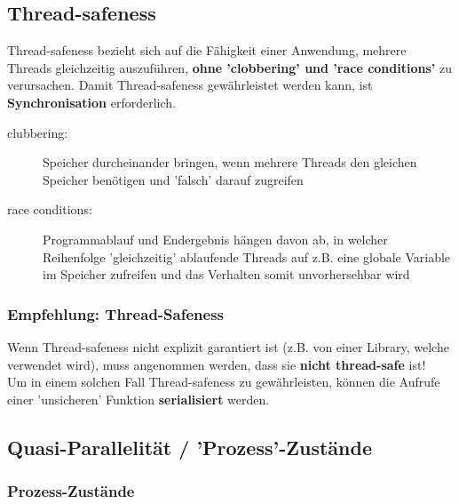 \subsection{Thread-safeness}

Thread-safeness bezieht sich auf die Fähigkeit einer Anwendung, mehrere Threads gleichzeitig auszuführen,
\textbf{ohne 'clobbering' und 'race conditions'} zu verursachen. Damit Thread-safeness gewährleistet werden kann, ist \textbf{Synchronisation}
erforderlich.

\vspace{0.1cm}

\begin{description}
    \item[clubbering:] Speicher durcheinander bringen, wenn mehrere Threads den gleichen Speicher benötigen und 'falsch' darauf zugreifen
    \item[race conditions:] Programmablauf und Endergebnis hängen davon ab, in welcher Reihenfolge 'gleichzeitig' ablaufende Threads auf z.B. eine
        globale Variable im Speicher zufreifen und das Verhalten somit unvorhersehbar wird
\end{description}


\subsubsection{Empfehlung: Thread-Safeness}

Wenn Thread-safeness nicht explizit garantiert ist (z.B. von einer Library, welche verwendet wird), muss  angenommen werden, dass sie 
\textbf{nicht thread-safe} ist! \\
Um in einem solchen Fall Thread-safeness zu gewährleisten, können die Aufrufe einer 'unsicheren' Funktion \textbf{serialisiert} werden.


\subsection{Quasi-Parallelität / 'Prozess'-Zustände}

\subsubsection{Prozess-Zustände}

